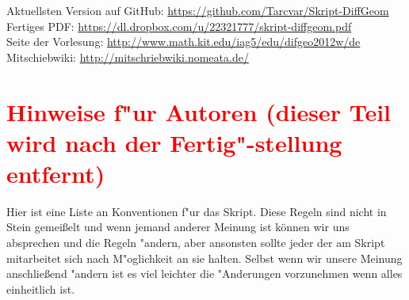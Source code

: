\documentclass[paper=A4, twoside, chapterprefix=true, bibliography=totoc, headsepline]{scrbook}
\begin{document}
Aktuellsten Version auf GitHub: \url{https://github.com/Tarcvar/Skript-DiffGeom}\\
Fertiges PDF: \url{https://dl.dropbox.com/u/22321777/skript-diffgeom.pdf}\\
Seite der Vorlesung: \url{http://www.math.kit.edu/iag5/edu/difgeo2012w/de}\\
Mitschiebwiki: \url{http://mitschriebwiki.nomeata.de/}

\section*{\textcolor{red}{Hinweise f"ur Autoren (dieser Teil wird nach der Fertig"-stellung entfernt)}}
Hier ist eine Liste an Konventionen f"ur das Skript. Diese Regeln sind nicht in Stein gemei\ss elt und wenn jemand anderer Meinung ist können wir uns absprechen und die Regeln "andern, aber ansonsten sollte jeder der am Skript mitarbeitet sich nach M"oglichkeit an sie halten. Selbst wenn wir unsere Meinung anschließend "andern ist es viel leichter die "Anderungen vorzunehmen wenn alles einheitlich ist.
\end{document}
